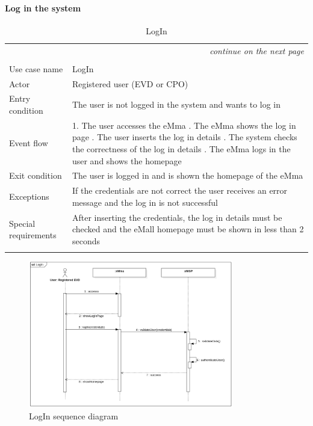 \paragraph{Log in the system}
\begin{center}
    \begin{longtable}{p{4cm} p{11cm}}
    \multicolumn{2}{r}{\itshape{continue on the next page}}\\
    \endfoot 
    \\
    \endlastfoot
    \hline
     Use case name &  LogIn\\
     \hline
     Actor & Registered user (EVD or CPO)\\
     \hline
     Entry condition &  The user is not logged in the system and wants to log in\\
     \hline
     Event flow &   1. The user accesses the eMma \newline
                    2. The eMma shows the log in page \newline
                    3. The user inserts the log in details \newline
                    4. The system checks the correctness of the log in details \newline
                    5. The eMma logs in the user and shows the homepage\\
     \hline
     Exit condition & The user is logged in and is shown the homepage of the eMma \\
     \hline
     Exceptions &  If the credentials are not correct the user receives an error message and the log in is not successful \\
     \hline
     Special requirements &  After inserting the credentials, the log in details must be checked and the eMall homepage must be shown in less than 2 seconds \\
     \hline
    \caption{LogIn}
    \label{tab:LogIn}
    \end{longtable}
\end{center}

\begin{figure}[H]
    \centering
    \includegraphics[width=0.8\textwidth]{Images/cp3/LogInSD.png}
    \caption{LogIn sequence diagram}
\end{figure}

